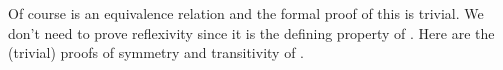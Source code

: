 Of course  is an equivalence relation and the formal proof of this is trivial. We don't need to prove reflexivity since it is the defining property of .  Here are the (trivial) proofs of symmetry and transitivity of .%
\ccpad
